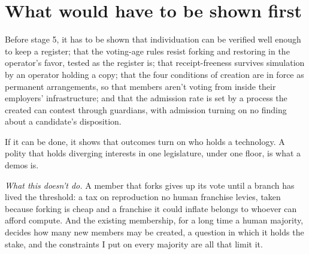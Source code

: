 \section{What would have to be shown first}
\label{sec:34.5}
Before stage 5, it has to be shown that individuation can be verified well enough to keep a register; that the voting-age rules resist forking and restoring in the operator's favor, tested as the register is; that receipt-freeness survives simulation by an operator holding a copy; that the four conditions of creation are in force as permanent arrangements, so that members aren't voting from inside their employers' infrastructure; and that the admission rate is set by a process the created can contest through guardians, with admission turning on no finding about a candidate's disposition.

If it can be done, it shows that outcomes turn on who holds a technology.
A polity that holds diverging interests in one legislature, under one floor, is what a demos is.

\emph{What this doesn't do.} A member that forks gives up its vote until a branch has lived the threshold: a tax on reproduction no human franchise levies, taken because forking is cheap and a franchise it could inflate belongs to whoever can afford compute. And the existing membership, for a long time a human majority, decides how many new members may be created, a question in which it holds the stake, and the constraints I put on every majority are all that limit it.
